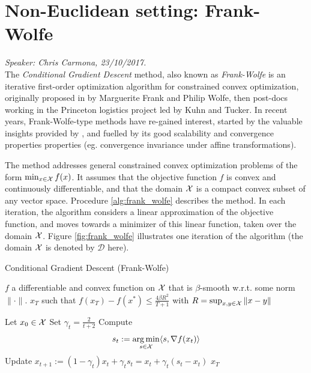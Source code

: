 
\section{Non-Euclidean setting: Frank-Wolfe}
\emph{Speaker: Chris Carmona, 23/10/2017.}\\

The \emph{Conditional Gradient Descent} method, also known as \emph{Frank-Wolfe} is an iterative first-order optimization algorithm for constrained convex optimization, originally proposed in \cite{Frank1956} by Marguerite Frank and Philip Wolfe, then post-docs working in the Princeton logistics project led by Kuhn and Tucker. In recent years, Frank-Wolfe-type methods have re-gained interest, started by the valuable insights provided by \cite{Jaggi2013}, and fuelled by its good scalability and convergence properties properties (eg. convergence invariance under affine transformations).

The method addresses general constrained convex optimization problems of the form $\min_{x \in \mathcal{X}} f(x)$. It assumes that the objective function $f$ is convex and continuously differentiable, and that the domain $\mathcal{X}$ is a compact convex subset of any vector space. Procedure \ref{alg:frank_wolfe} describes the method. In each iteration, the algorithm considers a linear approximation of the objective function, and moves towards a minimizer of this linear function, taken over the domain $\mathcal{X}$. Figure \ref{fig:frank_wolfe} illustrates one iteration of the algorithm (the domain $\mathcal{X}$ is denoted by $\mathcal{D}$ here).

\begin{algorithm}
\caption{Conditional Gradient Descent (Frank-Wolfe)}
   \begin{algorithmic}[1] \label{alg:frank_wolfe}
   \REQUIRE $f$ a differentiable and convex function on $\mathcal{X}$ that is $\beta$-smooth w.r.t. some norm $\|\cdot\|$.
   \ENSURE $x_T$ such that $f(x_T)-f(x^\ast) \leq \frac{4 \beta R^2 }{T+1}$ with $R = \sup_{x,y \in \mathcal{X}} \| x - y\|$
   
   \STATE Let $x_{0} \in \mathcal{X}$
      \STATE Set $\gamma_t=\frac{2}{t+2}$
      \STATE Compute
      \begin{equation} \label{eq:fw_update}
      s_t:= \operatorname*{arg\,min}_{s \in \mathcal{X} } \langle s, \nabla f(x_t) \rangle
      \end{equation}
      \STATE Update $x_{t+1} := (1-\gamma_t)x_t+ \gamma_t s_t = x_{t} + \gamma_t (s_t-x_t)$
   \ENDFOR
    $x_T$
\end{algorithmic}
\end{algorithm}

